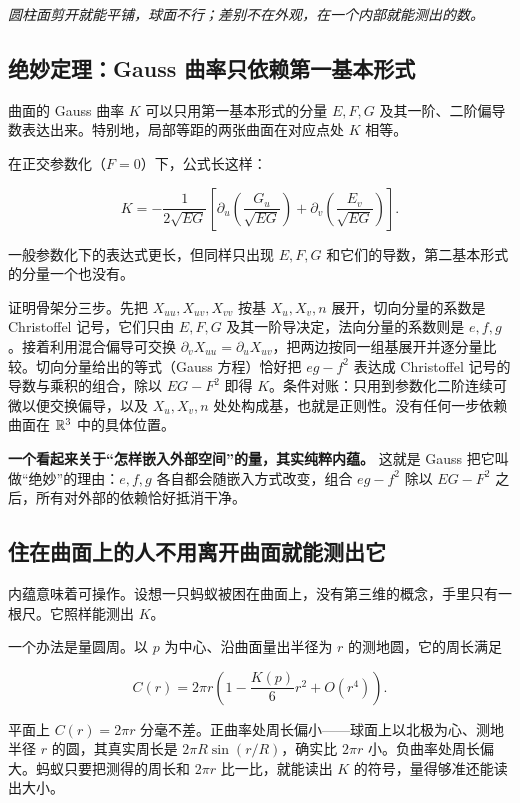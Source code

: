 \emph{圆柱面剪开就能平铺，球面不行；差别不在外观，在一个内部就能测出的数。}

\subsection{绝妙定理：Gauss 曲率只依赖第一基本形式}

\begin{theorem}
曲面的 Gauss 曲率 \(K\) 可以只用第一基本形式的分量 \(E,F,G\) 及其一阶、二阶偏导数表达出来。特别地，局部等距的两张曲面在对应点处 \(K\) 相等。
\end{theorem}

在正交参数化（\(F=0\)）下，公式长这样：

\[
K=-\frac{1}{2\sqrt{EG}}\left[
\partial_{u}\!\left(\frac{G_{u}}{\sqrt{EG}}\right)
+\partial_{v}\!\left(\frac{E_{v}}{\sqrt{EG}}\right)
\right].
\]

一般参数化下的表达式更长，但同样只出现 \(E,F,G\) 和它们的导数，第二基本形式的分量一个也没有。

证明骨架分三步。先把 \(X_{uu},X_{uv},X_{vv}\) 按基 \(X_{u},X_{v},n\) 展开，切向分量的系数是 Christoffel 记号，它们只由 \(E,F,G\) 及其一阶导决定，法向分量的系数则是 \(e,f,g\)。接着利用混合偏导可交换 \(\partial_{v}X_{uu}=\partial_{u}X_{uv}\)，把两边按同一组基展开并逐分量比较。切向分量给出的等式（Gauss 方程）恰好把 \(eg-f^{2}\) 表达成 Christoffel 记号的导数与乘积的组合，除以 \(EG-F^{2}\) 即得 \(K\)。条件对账：只用到参数化二阶连续可微以便交换偏导，以及 \(X_{u},X_{v},n\) 处处构成基，也就是正则性。没有任何一步依赖曲面在 \(\mathbb{R}^{3}\) 中的具体位置。

\textbf{一个看起来关于``怎样嵌入外部空间''的量，其实纯粹内蕴。} 这就是 Gauss 把它叫做``绝妙''的理由：\(e,f,g\) 各自都会随嵌入方式改变，组合 \(eg-f^{2}\) 除以 \(EG-F^{2}\) 之后，所有对外部的依赖恰好抵消干净。

\subsection{住在曲面上的人不用离开曲面就能测出它}

内蕴意味着可操作。设想一只蚂蚁被困在曲面上，没有第三维的概念，手里只有一根尺。它照样能测出 \(K\)。

一个办法是量圆周。以 \(p\) 为中心、沿曲面量出半径为 \(r\) 的测地圆，它的周长满足

\[
C(r)=2\pi r\left(1-\frac{K(p)}{6}r^{2}+O(r^{4})\right).
\]

平面上 \(C(r)=2\pi r\) 分毫不差。正曲率处周长偏小——球面上以北极为心、测地半径 \(r\) 的圆，其真实周长是 \(2\pi R\sin(r/R)\)，确实比 \(2\pi r\) 小。负曲率处周长偏大。蚂蚁只要把测得的周长和 \(2\pi r\) 比一比，就能读出 \(K\) 的符号，量得够准还能读出大小。

